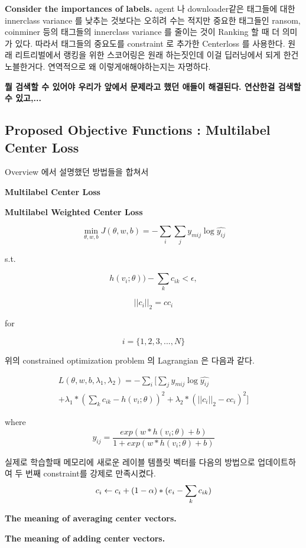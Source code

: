 \textbf{Consider the importances of labels. }
agent 나 downloader같은 태그들에 대한 innerclass variance 를 낮추는 것보다는 오히려 수는 적지만 중요한 태그들인 ransom, coinminer 등의 태그들의 innerclass variance 를 줄이는 것이 Ranking 할 때 더 의미가 있다. 따라서 태그들의 중요도를 constraint 로 추가한 Centerloss 를 사용한다. 
원래 리트리벌에서 랭킹을 위한 스코어링은 원래 하는짓인데 이걸 딥러닝에서 되게 한건 노블한거다. 연역적으로 왜 이렇게애해야하는지는 자명하다.


\textbf{뭘 검색할 수 있어야 우리가 앞에서 문제라고 했던 애들이 해결된다. 연산한걸 검색할 수 있고,...} 




\subsection{Proposed Objective Functions : Multilabel Center Loss}
Overview 에서 설명했던 방법들을 합쳐서 

\textbf{Multilabel Center Loss}

\textbf{Multilabel Weighted Center Loss}

\begin{equation}
\label{eqn:06}
\min_{\theta, w, b} J(\theta, w, b) = -\sum_i{ \sum_j{ y_{mij} \log{\hat{y_{ij}}}}}
\end{equation}

s.t.

\[
h(v_i;\theta)) - \sum_k{c_{ik}} < \epsilon ,
\]


\[
||c_i||_2 = cc_i
\]

for

\[
 i = \{1,2,3, ..., N\}
\]

위의 constrained optimization problem 의 Lagrangian 은 다음과 같다.

\begin{equation}
\label{eqn:07}
\begin{split}
L(\theta, w, b, \lambda_1, \lambda_2) = -\sum_i{[ \sum_j{ y_{mij} \log{\hat{y_{ij}}}}} \\  
+ \lambda_1 * (\sum_k{c_{ik}} - h(v_i;\theta))^2 + \lambda_2 * (||c_i||_2 - cc_i)^2 ]
\end{split}
\end{equation}

where 
\[
\hat{y_{ij}} = \frac{exp(w*h(v_i;\theta)+b)}{ 1 + exp(w*h(v_i;\theta)+b)}
\]

실제로 학습할때 메모리에 새로운 레이블 템플릿 벡터를 다음의 방법으로 업데이트하여 두 번째 constraint를 강제로 만족시켰다. 
\begin{equation}
\label{eqn:08}
c_i \leftarrow c_i + (1-\alpha) * (e_i - \sum_k{c_{ik}}) \\  
\end{equation}


\textbf{The meaning of averaging center vectors. }

\textbf{The meaning of adding center vectors. }



